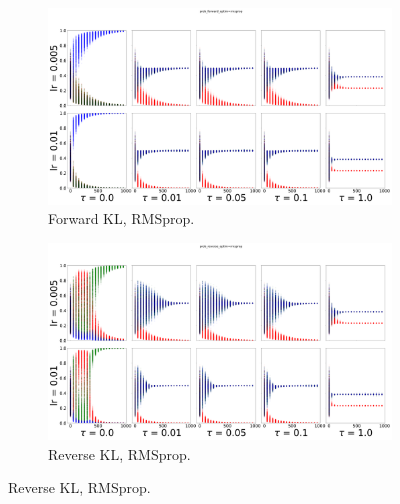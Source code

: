 \documentclass{article}
\begin{document}
\begin{figure}[!ht]
  \begin{subfigure}[b]{0.4\linewidth}
    \centering
    \includegraphics[width=1\columnwidth]{figs/discrete-bandit/notlearnQ/rmsprop/prob_forward_optim=rmsprop.png}
    \caption{Forward KL, RMSprop.}
    \label{fig:discrete-bandit-prob-forward-rmsprop}
  \end{subfigure}%
  \begin{subfigure}[b]{0.4\linewidth}
    \centering
    \includegraphics[width=1\columnwidth]{figs/discrete-bandit/notlearnQ/rmsprop/prob_reverse_optim=rmsprop.png}
    \caption{Reverse KL, RMSprop.}
    \label{fig:discrete-bandit-prob-reverse-rmsprop}
  \end{subfigure}
  

\end{figure}
\end{document}
